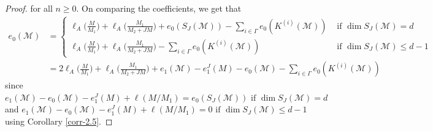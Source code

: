 \documentclass[11pt,reqno]{amsart}
\theoremstyle{definition}
\def\M{{\mathcal M}}
\numberwithin{equation}{section}
\begin{document}
\begin{proof}
	for all $n\geq 0$. On comparing the coefficients, we get that
	\begin{align*} 
		e_0(\M)&=\begin{cases}
			\ell_A\Big(\frac{M}{M_1}\Big)+ \ell_A\Big(\frac{M_1}{M_2+JM}\Big)+e_0(S_J(\M))-\mathop\sum\limits_{i\in\Gamma} e_0(K^{(i)}(\M)) & \text{  if } \dim S_J(\M)=d\\        
			\ell_A\Big(\frac{M}{M_1}\Big)+ \ell_A\Big(\frac{M_1}{M_2+JM}\Big)-\mathop\sum\limits_{i\in\Gamma} e_0(K^{(i)}(\M)) & \text{  if } \dim S_J(\M)\leq d-1
		\end{cases}\\
		&= 2\ell_A\Big(\frac{M}{M_1}\Big)+ \ell_A\Big(\frac{M_1}{M_2+JM}\Big)+e_1(\mathcal{M})-e_1^J(M)-e_0(\M)-\mathop\sum\limits_{i\in\Gamma}e_0(K^{(i)}(\M))
	\end{align*}
	since $e_1(\M)-e_0(\M)-e_1^J(M)+\ell(M/M_1)=e_0(S_J(\M))  \text{ if } \dim S_J(\M)=d$ and
	$e_1(\M)-e_0(\M)-e_1^J(M)+\ell(M/M_1)=0  \text{ if } \dim S_J(\M)\leq d-1$
	using Corollary \ref{corr-2.5}. 
\end{proof}

	
\end{document}
